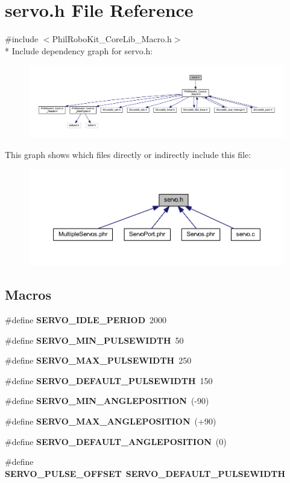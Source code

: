 \section{servo.\-h File Reference}
\label{servo_8h}
{\ttfamily \#include $<$Phil\-Robo\-Kit\-\_\-\-Core\-Lib\-\_\-\-Macro.\-h$>$}\\*
Include dependency graph for servo.\-h\-:\nopagebreak
\begin{figure}[H]
\begin{center}
\leavevmode
\includegraphics[width=350pt]{servo_8h__incl}
\end{center}
\end{figure}
This graph shows which files directly or indirectly include this file\-:\nopagebreak
\begin{figure}[H]
\begin{center}
\leavevmode
\includegraphics[width=350pt]{servo_8h__dep__incl}
\end{center}
\end{figure}
\subsection*{Macros}
\begin{DoxyCompactItemize}
\item 
\#define {\bf S\-E\-R\-V\-O\-\_\-\-I\-D\-L\-E\-\_\-\-P\-E\-R\-I\-O\-D}~2000
\item 
\#define {\bf S\-E\-R\-V\-O\-\_\-\-M\-I\-N\-\_\-\-P\-U\-L\-S\-E\-W\-I\-D\-T\-H}~50
\item 
\#define {\bf S\-E\-R\-V\-O\-\_\-\-M\-A\-X\-\_\-\-P\-U\-L\-S\-E\-W\-I\-D\-T\-H}~250
\item 
\#define {\bf S\-E\-R\-V\-O\-\_\-\-D\-E\-F\-A\-U\-L\-T\-\_\-\-P\-U\-L\-S\-E\-W\-I\-D\-T\-H}~150
\item 
\#define {\bf S\-E\-R\-V\-O\-\_\-\-M\-I\-N\-\_\-\-A\-N\-G\-L\-E\-P\-O\-S\-I\-T\-I\-O\-N}~(-\/90)
\item 
\#define {\bf S\-E\-R\-V\-O\-\_\-\-M\-A\-X\-\_\-\-A\-N\-G\-L\-E\-P\-O\-S\-I\-T\-I\-O\-N}~(+90)
\item 
\#define {\bf S\-E\-R\-V\-O\-\_\-\-D\-E\-F\-A\-U\-L\-T\-\_\-\-A\-N\-G\-L\-E\-P\-O\-S\-I\-T\-I\-O\-N}~(0)
\item 
\#define {\bf S\-E\-R\-V\-O\-\_\-\-P\-U\-L\-S\-E\-\_\-\-O\-F\-F\-S\-E\-T}~{\bf S\-E\-R\-V\-O\-\_\-\-D\-E\-F\-A\-U\-L\-T\-\_\-\-P\-U\-L\-S\-E\-W\-I\-D\-T\-H}
\end{DoxyCompactItemize}
